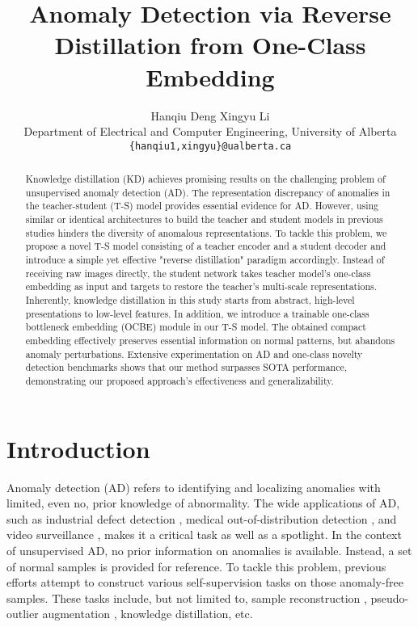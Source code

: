 \documentclass[10pt,twocolumn,letterpaper]{article}
\begin{document}
\title{Anomaly Detection via Reverse Distillation from One-Class Embedding}

\author{Hanqiu Deng \hspace{1cm} Xingyu Li\\
Department of Electrical and Computer Engineering, University of Alberta\\
{\tt\small \{hanqiu1,xingyu\}@ualberta.ca}
}
\maketitle

\begin{abstract}


Knowledge distillation (KD) achieves promising results on the challenging problem of unsupervised anomaly detection (AD). The representation discrepancy of anomalies in the teacher-student (T-S) model provides essential evidence for AD. However, using similar or identical architectures to build the teacher and student models in previous studies hinders the diversity of anomalous representations. To tackle this problem, we propose a novel T-S model consisting of a teacher encoder and a student decoder and introduce a simple yet effective "reverse distillation" paradigm accordingly. Instead of receiving raw images directly, the student network takes teacher model's one-class embedding as input and targets to restore the teacher's multi-scale representations. Inherently, knowledge distillation in this study starts from abstract, high-level presentations to low-level features. In addition, we introduce a trainable one-class bottleneck embedding (OCBE) module in our T-S model. The obtained compact embedding effectively preserves essential information on normal patterns, but abandons anomaly perturbations. Extensive experimentation on AD and one-class novelty detection benchmarks shows that our method surpasses SOTA performance, demonstrating our proposed approach's effectiveness and generalizability.
\end{abstract}

\section{Introduction}
\label{sec:intro}
Anomaly detection (AD) refers to identifying and localizing anomalies with limited, even no, prior knowledge of abnormality. The wide applications of AD, such as industrial defect detection \cite{mvtec}, medical out-of-distribution detection \cite{mood}, and video surveillance \cite{stc}, makes it a critical task as well as a spotlight. In the context of unsupervised AD, no prior information on anomalies is available. Instead, a set of normal samples is provided for reference. To tackle this problem, previous efforts attempt to construct various self-supervision tasks on those anomaly-free samples. These tasks include, but not limited to, sample reconstruction \cite{ssimae,fanogan,gn,memae,mnad,daad,pnet,cavga}, pseudo-outlier augmentation \cite{cutpaste,scadn,riad}, knowledge distillation\cite{mkd,us,stpm}, etc.
\end{document}
